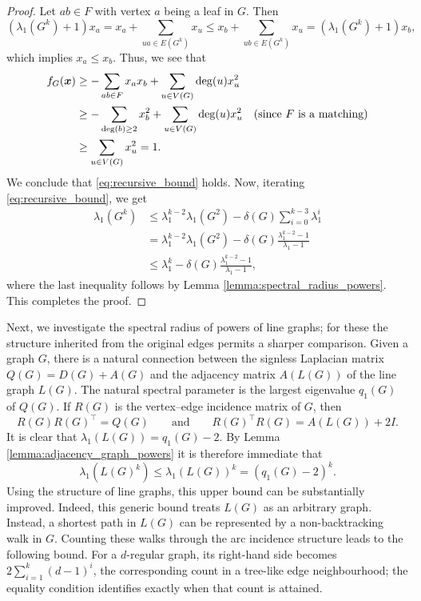 \documentclass[11pt]{article}
\theoremstyle{plain}
\numberwithin{equation}{section}
\def\x{\mbox{\boldmath $x$}}
\begin{document}
\begin{proof}
   Let $ab\in F$ with vertex $a$ being a leaf in $G$. Then 
   \[ (\lambda_1(G^k)+1)x_a = x_a + \sum_{ua \in E(G^k)} x_u \le x_b+\sum_{ub\in E(G^k)}x_u = (\lambda_1(G^k)+1)x_b,\]
   which implies $x_a\le x_b$. Thus, we see that 
   \begin{align*}
       f_G(\x) & \ge -\sum_{ab \in F}  x_ax_b + \sum_{u\in V(G)}\deg(u)x_u^2\\
       & \ge -\sum_{\deg(b)\ge 2}  x_b^2 + \sum_{u\in V(G)}\deg(u)x_u^2 \quad (\text{since $F$ is a matching})\\
       & \ge \sum_{u\in V(G)}x_u^2 = 1.
   \end{align*}
   We conclude that \eqref{eq:recursive_bound} holds. Now, iterating \eqref{eq:recursive_bound}, we get 
   \begin{align*}
       \lambda_1(G^k) & \le \lambda_1^{k-2}\lambda_1(G^2) - \delta(G)\sum_{i=0}^{k-3} \lambda_1^i \\
       & = \lambda_1^{k-2}\lambda_1(G^2) - \delta(G)\frac{\lambda_1^{k-2}-1}{\lambda_1-1}\\
       &\le \lambda_1^k - \delta(G)\frac{\lambda_1^{k-2}-1}{\lambda_1-1},
   \end{align*}
 where the last inequality follows by Lemma \ref{lemma:spectral_radius_powers}. This completes the proof.
\end{proof}

Next, we investigate the spectral radius of powers of line graphs; for these the structure inherited from the original edges permits a sharper comparison. Given a graph $G$, there is a natural connection between the signless Laplacian matrix $Q(G)=D(G)+A(G)$ and the adjacency matrix $A(L(G))$ of the line graph $L(G)$. The natural spectral parameter is the largest eigenvalue $q_1(G)$ of $Q(G)$. If $R(G)$ is the vertex--edge incidence matrix of $G$, then
\begin{equation}
    R(G)R(G)^\top = Q(G)\qquad \text{and}\qquad R(G)^\top R(G) = A(L(G)) + 2I.
\end{equation}
It is clear that $\lambda_1(L(G)) = q_1(G)-2$. By Lemma \ref{lemma:adjacency_graph_powers} it is therefore immediate that 
\begin{equation}
    \lambda_1(L(G)^k) \le \lambda_1(L(G))^k = (q_1(G)-2)^k.  
\end{equation}
Using the structure of line graphs, this upper bound can be substantially improved. Indeed, this generic bound treats $L(G)$ as an arbitrary graph. Instead, a shortest path in $L(G)$ can be represented by a non-backtracking walk in $G$. Counting these walks through the arc incidence structure leads to the following bound. For a $d$-regular graph, its right-hand side becomes $2\sum_{i=1}^k(d-1)^i$, the corresponding count in a tree-like edge neighbourhood; the equality condition identifies exactly when that count is attained.
\end{document}
